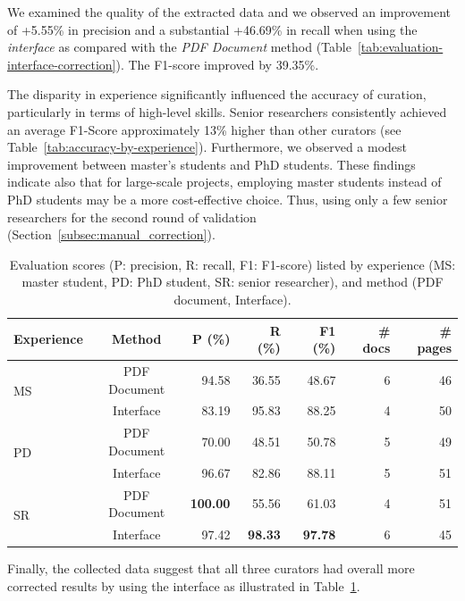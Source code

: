 We examined the quality of the extracted data and we observed an improvement of +5.55\% in precision and a substantial +46.69\% in recall when using the \textit{interface} as compared with the \textit{PDF Document} method (Table~\ref{tab:evaluation-interface-correction}). 
The F1-score improved by 39.35\%.

The disparity in experience significantly influenced the accuracy of curation, particularly in terms of high-level skills. Senior researchers consistently achieved an average F1-Score approximately 13\% higher than other curators (see Table~\ref{tab:accuracy-by-experience}). Furthermore, we observed a modest improvement between master's students and PhD students. These findings indicate also that for large-scale projects, employing master students instead of PhD students may be a more cost-effective choice. Thus, using only a few senior researchers for the second round of validation (Section~\ref{subsec:manual_correction}).

\begin{table}[htbp]
\centering\small
\caption{Evaluation scores (P: precision, R: recall, F1: F1-score) listed by experience (MS: master student, PD: PhD student, SR: senior researcher), and method (PDF document, Interface). }
\begin{tabular}{lcrrrrr}
\toprule
\textbf{Experience} & \textbf{Method} & \textbf{P (\%)} & \textbf{R (\%)} & 
\textbf{F1 (\%)}  & \textbf{\# docs} & \textbf{\# pages}\\
\midrule
\multirow{2}{*}{MS} & PDF Document & 94.58 & 36.55 & 48.67 & 6 & 46 \\
 & Interface & 83.19 & 95.83 & 88.25 & 4 & 50 \\
\midrule
\multirow{2}{*}{PD} & PDF Document & 70.00 & 48.51 & 50.78 & 5 & 49 \\
 & Interface & 96.67 & 82.86 & 88.11 & 5 & 51\\
\midrule
\multirow{2}{*}{SR} & PDF Document & \textbf{100.00} & 55.56 & 61.03 & 4 & 51\\
 & Interface & 97.42 & \textbf{98.33} & \textbf{97.78} & 6 & 45\\
\bottomrule
\end{tabular}
\label{tab:accuracy-by-experience-method}
\end{table}

Finally, the collected data suggest that all three curators had overall more corrected results by using the interface as illustrated in Table~\ref{tab:accuracy-by-experience-method}. 

